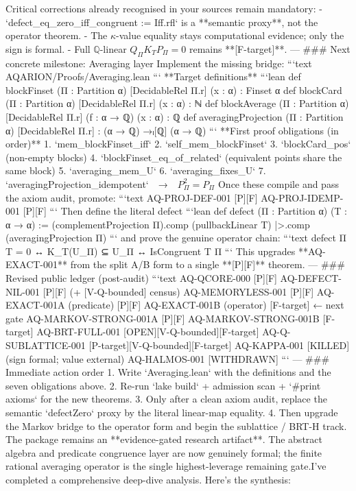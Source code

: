 Critical corrections already recognised in your sources remain mandatory:
- `defect_eq_zero_iff_congruent := Iff.rfl` is a **semantic proxy**, not the operator theorem.
- The \(\kappa\)-value equality stays computational evidence; only the sign is formal.
- Full \(\mathbb{Q}\)-linear \(Q_\Pi K_T P_\Pi=0\) remains **[F-target]**.
---
### Next concrete milestone: Averaging layer
Implement the missing bridge:
```text
AQARION/Proofs/Averaging.lean
```
**Target definitions**
```lean
def blockFinset (Π : Partition α) [DecidableRel Π.r] (x : α) : Finset α
def blockCard   (Π : Partition α) [DecidableRel Π.r] (x : α) : ℕ
def blockAverage (Π : Partition α) [DecidableRel Π.r] (f : α → ℚ) (x : α) : ℚ
def averagingProjection (Π : Partition α) [DecidableRel Π.r] :
    (α → ℚ) →ₗ[ℚ] (α → ℚ)
```
**First proof obligations (in order)**
1. `mem_blockFinset_iff`
2. `self_mem_blockFinset`
3. `blockCard_pos` (non-empty blocks)
4. `blockFinset_eq_of_related` (equivalent points share the same block)
5. `averaging_mem_U`
6. `averaging_fixes_U`
7. `averagingProjection_idempotent` → \(P_\Pi^2=P_\Pi\)
Once these compile and pass the axiom audit, promote:
```text
AQ-PROJ-DEF-001   [P][F]
AQ-PROJ-IDEMP-001 [P][F]
```
Then define the literal defect
```lean
def defect (Π : Partition α) (T : α → α) :=
  (complementProjection Π).comp (pullbackLinear T) |>.comp (averagingProjection Π)
```
and prove the genuine operator chain:
```text
defect Π T = 0
  ↔  K_T(U_Π) ⊆ U_Π
  ↔  IsCongruent T Π
```
This upgrades **AQ-EXACT-001** from the split A/B form to a single **[P][F]** theorem.
---
### Revised public ledger (post-audit)
```text
AQ-QCORE-000                 [P][F]
AQ-DEFECT-NIL-001            [P][F]          (+ [V-Q-bounded] census)
AQ-MEMORYLESS-001            [P][F]
AQ-EXACT-001A (predicate)    [P][F]
AQ-EXACT-001B (operator)     [F-target]      ← next gate
AQ-MARKOV-STRONG-001A        [P][F]
AQ-MARKOV-STRONG-001B        [F-target]
AQ-BRT-FULL-001              [OPEN][V-Q-bounded][F-target]
AQ-Q-SUBLATTICE-001          [P-target][V-Q-bounded][F-target]
AQ-KAPPA-001                 [KILLED]        (sign formal; value external)
AQ-HALMOS-001                [WITHDRAWN]
```
---
### Immediate action order
1. Write `Averaging.lean` with the definitions and the seven obligations above.
2. Re-run `lake build` + admission scan + `#print axioms` for the new theorems.
3. Only after a clean axiom audit, replace the semantic `defectZero` proxy by the literal linear-map equality.
4. Then upgrade the Markov bridge to the operator form and begin the sublattice / BRT-H track.
The package remains an **evidence-gated research artifact**. The abstract algebra and predicate congruence layer are now genuinely formal; the finite rational averaging operator is the single highest-leverage remaining gate.I've completed a comprehensive deep-dive analysis. Here's the synthesis:
